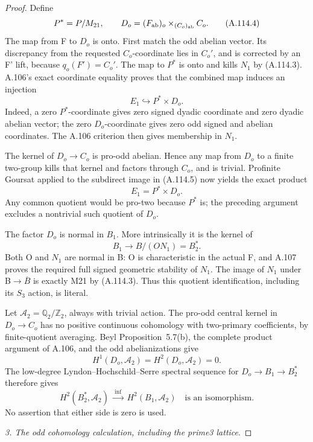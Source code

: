 \begin{proof}
Define
\[
P^*=P/M_{21},\qquad
D_o=(F_{\rm ab})_o\times_{(C_o)_{\rm ab}}C_o.                   \tag{A.114.4}
\]
The map from F to \(D_o\) is onto. First match the odd abelian vector. Its discrepancy from the requested \(C_o\)-coordinate lies in \(C_o'\), and is corrected by an F' lift, because \(q_o(F')=C_o'\). The map to \(P^*\) is onto and kills \(N_1\) by (A.114.3). A.106's exact coordinate equality proves that the combined map induces an injection
\[
E_1\hookrightarrow P^*\times D_o.                             \tag{A.114.5}
\]
Indeed, a zero \(P^*\)-coordinate gives zero signed dyadic coordinate and zero dyadic abelian vector; the zero \(D_o\)-coordinate gives zero odd signed and abelian coordinates. The A.106 criterion then gives membership in \(N_1\).

The kernel of \(D_o\to C_o\) is pro-odd abelian. Hence any map from \(D_o\) to a finite two-group kills that kernel and factors through \(C_o\), and is trivial. Profinite Goursat applied to the subdirect image in (A.114.5) now yields the exact product
\[
E_1=P^*\times D_o.                                            \tag{A.114.6}
\]
Any common quotient would be pro-two because \(P^*\) is; the preceding argument excludes a nontrivial such quotient of \(D_o\).

The factor \(D_o\) is normal in \(B_1\). More intrinsically it is the kernel of
\[
B_1\longrightarrow B/(ON_1)=B_2^*.
\]
Both O and \(N_1\) are normal in B: O is characteristic in the actual F, and A.107 proves the required full signed geometric stability of \(N_1\). The image of \(N_1\) under B\(\to\)\(\overline B\) is exactly M21 by (A.114.3). Thus this quotient identification, including its \(S_3\) action, is literal.

Let \(\mathcal A_2=\mathbb Q_2/\mathbb Z_2\), always with trivial action. The pro-odd central kernel in \(D_o\to C_o\) has no positive continuous cohomology with two-primary coefficients, by finite-quotient averaging. Beyl Proposition~5.7(b), the complete product argument of A.106, and the odd abelianizations give
\[
H^1(D_o,\mathcal A_2)=H^2(D_o,\mathcal A_2)=0.                 \tag{A.114.7}
\]
The low-degree Lyndon--Hochschild--Serre spectral sequence for \(D_o\to B_1\to B_2^*\) therefore gives
\[
H^2(B_2^*,\mathcal A_2)\ \xrightarrow{\ \mathrm{inf}\ }\ 
H^2(B_1,\mathcal A_2)
\quad\text{is an isomorphism}.                               \tag{A.114.8}
\]
No assertion that either side is zero is used.

\medskip\noindent\emph{3. The odd cohomology calculation, including the prime3 lattice}.


\end{proof}
